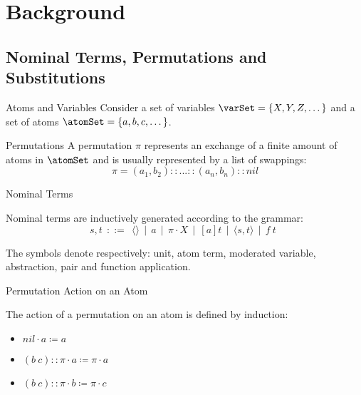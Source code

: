 \section{Background}
\subsection{Nominal Terms, Permutations and Substitutions}
\begin{frame}{Atoms and Variables} 
    Consider a set of variables $\varSet = \{X, Y, Z, \dots \}$ and 
    a set of atoms $\atomSet = \{a, b, c, \dots \}$.
\end{frame}

\begin{frame}{Permutations}
    A permutation $\pi$ represents an exchange of a finite amount of atoms in
    $\atomSet$
    and is usually represented by a list of swappings: 
\begin{equation*}
    \pi = (a_1, b_2):: ... ::(a_n, b_n)::nil 
\end{equation*}
\end{frame}

\begin{frame}{Nominal Terms}
    \begin{definition}
    Nominal terms are inductively generated according to the grammar: 
    \begin{equation*}
        s,t \ \ ::= \ \ \langle \rangle \ \ | \ \ a \ \ | \ \ \pi \cdot X \ \ | \ \ [a]t \ \ |
                    \ \ \langle s, t \rangle \ \       | \ \ f \ t \ \   
    \end{equation*}
    \end{definition}
    The symbols denote respectively: unit, atom term, moderated variable,
    abstraction, pair and function application.
\end{frame}

\begin{frame}{Permutation Action on an Atom}
    \begin{definition}
    The action of a permutation on an atom is defined by induction: 
    \begin{itemize} 
        \item $nil \cdot a \coloneqq a$ 
        \item $(b \ c):: \pi \cdot a \coloneqq \pi \cdot a$ 
        \item $(b \ c):: \pi \cdot b \coloneqq \pi \cdot c$ 
    \end{itemize}
    \end{definition}
\end{frame}

